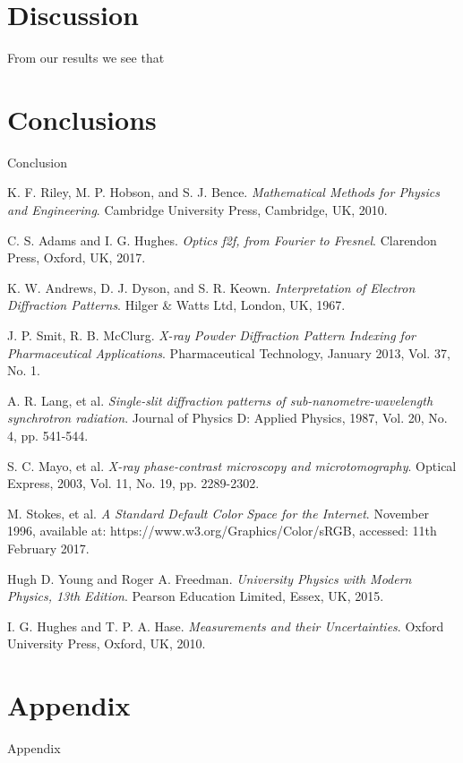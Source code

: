 \documentclass[twocolumn]{revtex4}
\begin{document}
\vspace{-3ex}
\section{Discussion}
\vspace{-2ex}
From our results we see that 

\Blindtext

\vspace{-5ex}
\section{Conclusions}
\vspace{-2ex}

Conclusion

\blindtext

\begin{thebibliography}{5}
	K. F. Riley, M. P. Hobson, and S. J. Bence.
	\textit{Mathematical Methods for Physics and Engineering}.
	Cambridge University Press, Cambridge, UK, 2010.
	
	C. S. Adams and I. G. Hughes.
	\textit{Optics f2f, from Fourier to Fresnel}.
	Clarendon Press, Oxford, UK, 2017.

	K. W. Andrews, D. J. Dyson, and S. R. Keown.
	\textit{Interpretation of Electron Diffraction Patterns}.
	Hilger \& Watts Ltd, London, UK, 1967.
	
	J. P. Smit, R. B. McClurg.	
	\textit{X-ray Powder Diffraction Pattern Indexing for Pharmaceutical Applications}.
	Pharmaceutical Technology, January 2013, Vol. 37, No. 1.
	
	A. R. Lang, et al.
	\textit{Single-slit diffraction patterns of sub-nanometre-wavelength synchrotron radiation}.
	Journal of Physics D: Applied Physics, 1987, Vol. 20, No. 4, pp. 541-544.
	
	S. C. Mayo, et al.
	\textit{X-ray phase-contrast microscopy and microtomography}.
	Optical Express, 2003, Vol. 11, No. 19, pp. 2289-2302.
	
	M. Stokes, et al.
	\textit{A Standard Default Color Space for the Internet}.
	November 1996, available at: https://www.w3.org/Graphics/Color/sRGB, accessed: 11th February 2017. 

	Hugh D. Young and Roger A. Freedman.
	\textit{University Physics with Modern Physics, 13th Edition}. 
	Pearson Education Limited, Essex, UK, 2015.
	
	I. G. Hughes and T. P. A. Hase.
	\textit{Measurements and their Uncertainties}. 
	Oxford University Press, Oxford, UK, 2010.
	
\end{thebibliography}
\clearpage

\vfill
\twocolumngrid
\vspace{-3ex}
\section*{Appendix}
\vspace{-2ex}

Appendix


\clearpage
\end{document}
